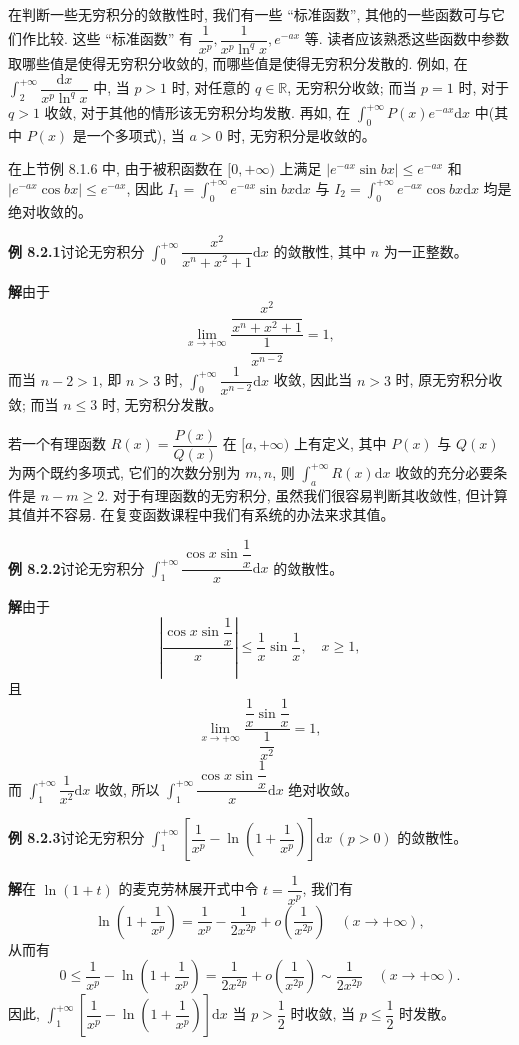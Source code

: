 \documentclass[UTF8,12pt,a4paper,fontset=fandol]{ctexart}
\begin{document}
在判断一些无穷积分的敛散性时, 我们有一些 ``标准函数'', 其他的一些函数可与它们作比较. 这些 ``标准函数'' 有 $\dfrac1{x^p},\dfrac1{x^p\ln^q x},e^{-ax}$ 等. 读者应该熟悉这些函数中参数取哪些值是使得无穷积分收敛的, 而哪些值是使得无穷积分发散的. 例如, 在 $\int_2^{+\infty}\dfrac{\mathrm dx}{x^p\ln^q x}$ 中, 当 $p>1$ 时, 对任意的 $q\in\mathbb R$, 无穷积分收敛; 而当 $p=1$ 时, 对于 $q>1$ 收敛, 对于其他的情形该无穷积分均发散. 再如, 在 $\int_0^{+\infty}P(x)e^{-ax}\mathrm dx$ 中(其中 $P(x)$ 是一个多项式), 当 $a>0$ 时, 无穷积分是收敛的。

在上节例 8.1.6 中, 由于被积函数在 $[0,+\infty)$ 上满足 $|e^{-ax}\sin bx|\leq e^{-ax}$ 和 $|e^{-ax}\cos bx|\leq e^{-ax}$, 因此 $I_1=\int_0^{+\infty}e^{-ax}\sin bx\mathrm dx$ 与 $I_2=\int_0^{+\infty}e^{-ax}\cos bx\mathrm dx$ 均是绝对收敛的。

\noindent\textbf{例 8.2.1}\quad 讨论无穷积分 $\int_0^{+\infty}\dfrac{x^2}{x^n+x^2+1}\mathrm dx$ 的敛散性, 其中 $n$ 为一正整数。

\noindent\textbf{解}\quad 由于
\[
  \lim_{x\to+\infty}
  \frac{\dfrac{x^2}{x^n+x^2+1}}{\dfrac1{x^{n-2}}}
  =
  1,
\]
而当 $n-2>1$, 即 $n>3$ 时, $\int_0^{+\infty}\dfrac1{x^{n-2}}\mathrm dx$ 收敛, 因此当 $n>3$ 时, 原无穷积分收敛; 而当 $n\leq3$ 时, 无穷积分发散。

若一个有理函数 $R(x)=\dfrac{P(x)}{Q(x)}$ 在 $[a,+\infty)$ 上有定义, 其中 $P(x)$ 与 $Q(x)$ 为两个既约多项式, 它们的次数分别为 $m,n$, 则 $\int_a^{+\infty}R(x)\mathrm dx$ 收敛的充分必要条件是 $n-m\geq2$. 对于有理函数的无穷积分, 虽然我们很容易判断其收敛性, 但计算其值并不容易. 在复变函数课程中我们有系统的办法来求其值。

\noindent\textbf{例 8.2.2}\quad 讨论无穷积分 $\int_1^{+\infty}\dfrac{\cos x\sin\dfrac1x}{x}\mathrm dx$ 的敛散性。

\noindent\textbf{解}\quad 由于
\[
  \left|\frac{\cos x\sin\dfrac1x}{x}\right|
  \leq
  \frac1x\sin\frac1x,\quad x\geq1,
\]
且
\[
  \lim_{x\to+\infty}
  \frac{\dfrac1x\sin\dfrac1x}{\dfrac1{x^2}}=1,
\]
而 $\int_1^{+\infty}\dfrac1{x^2}\mathrm dx$ 收敛, 所以 $\int_1^{+\infty}\dfrac{\cos x\sin\dfrac1x}{x}\mathrm dx$ 绝对收敛。

\noindent\textbf{例 8.2.3}\quad 讨论无穷积分 $\int_1^{+\infty}\left[\dfrac1{x^p}-\ln\left(1+\dfrac1{x^p}\right)\right]\mathrm dx\ (p>0)$ 的敛散性。

\noindent\textbf{解}\quad 在 $\ln(1+t)$ 的麦克劳林展开式中令 $t=\dfrac1{x^p}$, 我们有
\[
  \ln\left(1+\frac1{x^p}\right)
  =
  \frac1{x^p}-\frac1{2x^{2p}}+o\left(\frac1{x^{2p}}\right)
  \quad(x\to+\infty),
\]
从而有
\[
  0\leq
  \frac1{x^p}-\ln\left(1+\frac1{x^p}\right)
  =
  \frac1{2x^{2p}}+o\left(\frac1{x^{2p}}\right)
  \sim
  \frac1{2x^{2p}}
  \quad(x\to+\infty).
\]
因此, $\int_1^{+\infty}\left[\dfrac1{x^p}-\ln\left(1+\dfrac1{x^p}\right)\right]\mathrm dx$ 当 $p>\dfrac12$ 时收敛, 当 $p\leq\dfrac12$ 时发散。
\end{document}

